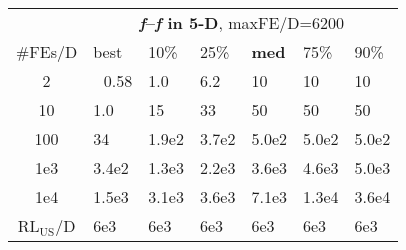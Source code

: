 \begin{tabular}{c|llllll}
 & \multicolumn{6}{|c}{\textbf{\textit{f}\raisebox{-0.35ex}{1}--\textit{f}\raisebox{-0.35ex}{24} in 5-D}, maxFE/D=6200}\\
\#FEs/D & best & 10\% & 25\% & \textbf{med} & 75\% & 90\%\\
2 & ~\,0.58 & \hspace*{1ex}1.0 & \hspace*{1ex}6.2 & 10 & 10 & 10\\
10 & \hspace*{1ex}1.0 & 15 & 33 & 50 & 50 & 50\\
100 & 34 & 1.9e2 & 3.7e2 & 5.0e2 & 5.0e2 & 5.0e2\\
1e3 & 3.4e2 & 1.3e3 & 2.2e3 & 3.6e3 & 4.6e3 & 5.0e3\\
1e4 & 1.5e3 & 3.1e3 & 3.6e3 & 7.1e3 & 1.3e4 & 3.6e4\\
$\text{RL}_{\text{US}}$/D & 6e3 & 6e3 & 6e3 & 6e3 & 6e3 & 6e3
\end{tabular}
